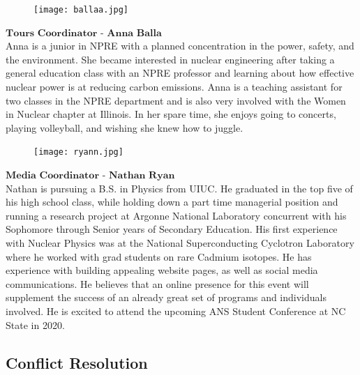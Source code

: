 \setlength\intextsep{0pt}
\begin{figure}
	\begin{center}
		\vspace{-\baselineskip}
		\texttt{[image: ballaa.jpg]}
	\end{center}
\end{figure}
$\textbf{Tours Coordinator - Anna Balla}$\\
Anna is a junior in NPRE with a planned concentration in the power, safety, and the environment. She became interested in nuclear engineering after taking a general education class with an NPRE professor and learning about how effective nuclear power is at reducing carbon emissions. Anna is a teaching assistant for two classes in the NPRE department and is also very involved with the Women in Nuclear chapter at Illinois. In her spare time, she enjoys going to concerts, playing volleyball, and wishing she knew how to juggle.

\setlength\intextsep{0pt}
\begin{figure}
	\begin{center}
		\vspace{-\baselineskip}
		\texttt{[image: ryann.jpg]}
	\end{center}
\end{figure}
$\textbf{Media Coordinator - Nathan Ryan}$\\
Nathan is pursuing a B.S. in Physics from UIUC. He graduated in the top five of his high school class, while holding down a part time managerial position and running a research project at Argonne National Laboratory concurrent with his Sophomore through Senior years of Secondary Education. His first experience with Nuclear Physics was at the National Superconducting Cyclotron Laboratory where he worked with grad students on rare Cadmium isotopes. He has experience with building appealing website pages, as well as social media communications. He believes that an online presence for this event will supplement the success of an already great set of programs and individuals involved. He is excited to attend the upcoming ANS Student Conference at NC State in 2020.


\subsection{Conflict Resolution}

